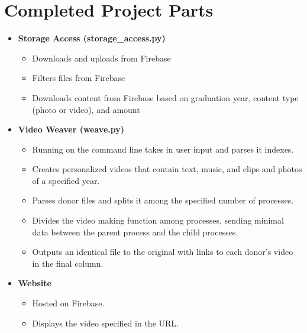 \documentclass{article}
\begin{document}
\section{Completed Project Parts}
\begin{itemize}
    \item  \bf{Storage Access (storage\_access.py)}
    \begin{itemize}
        \item Downloads and uploads from Firebase
        \item Filters files from Firebase
        \item Downloads content from Firebase based on graduation year, content type (photo or video), and amount
    \end{itemize}
    \item  \bf{Video Weaver (weave.py)}
    \begin{itemize}
        \item Running on the command line takes in user input and parses it indexes.
        \item Creates personalized videos that contain text, music, and clips and photos of a specified year.
        \item Parses donor files and splits it among the specified number of processes.
        \item Divides the video making function among processes, sending minimal data between the parent process and the child processes.
        \item Outputs an identical file to the original with links to each donor's video in the final column.
    \end{itemize}
    \item \bf{Website}
    \begin{itemize}
        \item Hosted on Firebase.
        \item Displays the video specified in the URL.
    \end{itemize}
\end{itemize}
\end{document}
